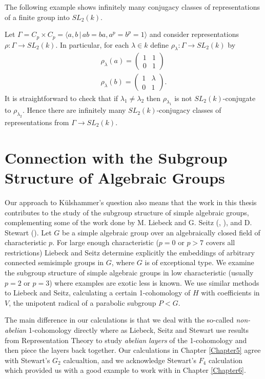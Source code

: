 The following example shows infinitely many conjugacy classes of representations of a finite group into $SL_2(k)$.
\begin{example}
  Let $\Gamma = C_p \times C_p = \langle a, b \,|\, ab = ba, a^p = b^p = 1 \rangle$ and consider representations $\rho: \Gamma \rightarrow SL_2(k)$. In particular, for each $\lambda \in k$ define $\rho_\lambda: \Gamma \rightarrow SL_2(k)$ by
  \begin{eqnarray*}
    \rho_\lambda(a) = \left( \begin{matrix} 1 & 1 \\ 0 & 1 \end{matrix} \right) \\
    \rho_\lambda(b) = \left( \begin{matrix} 1 & \lambda \\ 0 & 1 \end{matrix} \right).
  \end{eqnarray*}
  It is straightforward to check that if $\lambda_1 \neq \lambda_2$ then $\rho_{\lambda_1}$ is not $SL_2(k)$-conjugate to $\rho_{\lambda_2}$. Hence there are infinitely many $SL_2(k)$-conjugacy classes of representations from $\Gamma \rightarrow SL_2(k)$.
\end{example}

\section{Connection with the Subgroup Structure of Algebraic Groups}

Our approach to K\"ulshammer's question also means that the work in this thesis contributes to the study of the subgroup structure of simple algebraic groups, complementing some of the work done by M. Liebeck and G. Seitz (\cite{liebeck1996reductive}, \cite{liebeck2004maximal}), and D. Stewart (\cite{stewart2010g}). Let $G$ be a simple algebraic group over an algebraically closed field of characteristic $p$. For large enough characteristic ($p=0$ or $p>7$ covers all restrictions) Liebeck and Seitz determine explicitly the embeddings of arbitrary connected semisimple groups in $G$, where $G$ is of exceptional type. We examine the subgroup structure of simple algebraic groups in low characteristic (usually $p=2$ or $p=3$) where examples are exotic less is known. We use similar methods to Liebeck and Seitz, calculating a certain 1-cohomology of $H$ with coefficients in $V$, the unipotent radical of a parabolic subgroup $P < G$.

The main difference in our calculations is that we deal with the so-called \emph{non-abelian} 1-cohomology directly where as Liebeck, Seitz and Stewart use results from Representation Theory to study \emph{abelian layers} of the 1-cohomology and then piece the layers back together. Our calculations in Chapter \ref{Chapter5} agree with Stewart's $G_2$ calcualtion, and we acknowledge Stewart's $F_4$ calculation which provided us with a good example to work with in Chapter \ref{Chapter6}.

